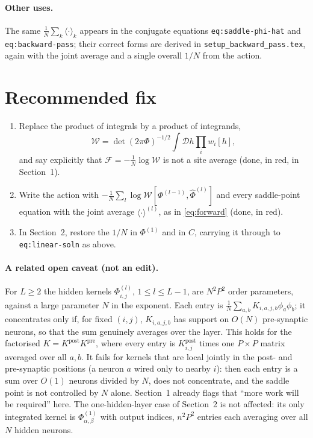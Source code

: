 \documentclass[11pt,a4paper]{article}
\newcommand{\D}{\mathcal D}
\newcommand{\W}{\mathcal W}
\newcommand{\F}{\mathcal F}
\begin{document}
\paragraph{Other uses.}
The same $\frac1N\sum_k\langle\cdot\rangle_k$ appears in the conjugate
equations \texttt{eq:saddle-phi-hat} and \texttt{eq:backward-pass}; their
correct forms are derived in \texttt{setup\_backward\_pass.tex}, again with the
joint average and a single overall $1/N$ from the action.

\section{Recommended fix}

\begin{enumerate}
  \item Replace the product of integrals by a product of integrands,
    \[\W = \det(2\pi\Phi)^{-1/2}\int\D h\prod_iw_i[h],\]
    and say explicitly that
    $\F = -\frac1N\log\W$ is not a site average (done, in red, in Section~1).
  \item Write the action with $-\frac1N\sum_l\log\W[\Phi^{(l-1)},\hat\Phi^{(l)}]$
    and every saddle-point equation with the joint
    average
    $\langle\cdot\rangle^{(l)}$, as in \eqref{eq:forward} (done, in red).
  \item In Section~2, restore the $1/N$ in $\Phi^{(1)}$ and in $C$, carrying it
    through to \texttt{eq:linear-soln} as above.
\end{enumerate}

\paragraph{A related open caveat (not an edit).}
For $L\ge2$ the hidden kernels $\Phi^{(l)}_{i,j}$, $1\le l\le L-1$, are
$N^2P^2$ order parameters, against a large parameter $N$ in the exponent.
Each entry is $\frac1N\sum_{a,b}K_{i,a,j,b}\phi_a\phi_b$; it concentrates only if,
for fixed $(i,j)$, $K_{i,a,j,b}$ has support on $O(N)$ pre-synaptic neurons, so
that the sum genuinely averages over the layer. This holds for the factorised
$K = K^{\text{post}}K^{\text{pre}}$, where every entry is $K^{\text{post}}_{i,j}$
times one $P\times P$ matrix averaged over all $a,b$. It fails for kernels that
are local jointly in the post- and pre-synaptic positions (a neuron $a$ wired
only to nearby $i$): then each entry is a sum over $O(1)$ neurons divided by
$N$, does not concentrate, and the saddle point is not controlled by $N$
alone. Section~1 already flags that
``more work will be required'' here. The one-hidden-layer case of Section~2 is
not affected: its only integrated kernel is $\Phi^{(1)}_{\alpha,\beta}$ with
output indices, $n^2P^2$ entries each averaging over all $N$ hidden neurons.
\end{document}
